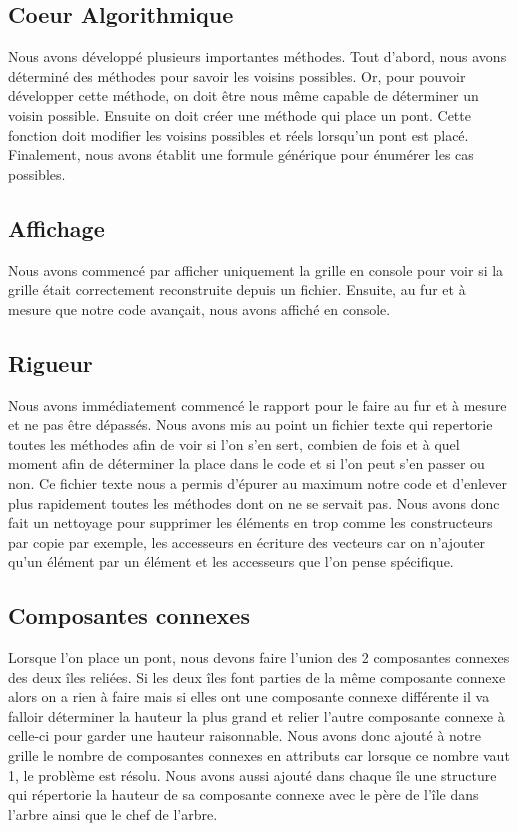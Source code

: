\documentclass{article}
\begin{document}
    \subsection{\Large Coeur Algorithmique}
    \hspace{0.5cm} Nous avons développé plusieurs importantes méthodes. Tout d'abord, nous avons déterminé des méthodes pour savoir les voisins possibles. Or, pour pouvoir développer cette méthode, on doit être nous même capable de déterminer un voisin possible. Ensuite on doit créer une méthode qui place un pont. Cette fonction doit modifier les voisins possibles et réels lorsqu'un pont est placé.
    Finalement, nous avons établit une formule générique pour énumérer les cas possibles.
    
    \subsection{\Large Affichage}
    \hspace{0.5cm} Nous avons commencé par afficher uniquement la grille en console pour voir si la grille était correctement reconstruite depuis un fichier. Ensuite, au fur et à mesure que notre code avançait, nous avons affiché en console.
    
    \subsection{\Large Rigueur}
    \hspace{0.5cm} Nous avons immédiatement commencé le rapport pour le faire au fur et à mesure et ne pas être dépassés. 
    Nous avons mis au point un fichier texte qui repertorie toutes les méthodes afin de voir si l'on s'en sert, combien de fois et à quel moment afin de déterminer la place dans le code et si l'on peut s'en passer ou non. Ce fichier texte nous a permis d'épurer au maximum notre code et d'enlever plus rapidement toutes les méthodes dont on ne se servait pas. Nous avons donc fait un nettoyage pour supprimer les éléments en trop comme les constructeurs par copie par exemple, les accesseurs en écriture des vecteurs car on n'ajouter qu'un élément par un élément et les accesseurs que l'on pense spécifique.
    
    \subsection{\Large Composantes connexes}
    \hspace{0.5cm} Lorsque l'on place un pont, nous devons faire l'union des 2 composantes connexes des deux îles reliées. Si les deux îles font parties de la même composante connexe alors on a rien à faire mais si elles ont une composante connexe différente il va falloir déterminer la hauteur la plus grand et relier l'autre composante connexe à celle-ci pour garder une hauteur raisonnable. 
    Nous avons donc ajouté à notre grille le nombre de composantes connexes en attributs car lorsque ce nombre vaut 1, le problème est résolu. Nous avons aussi ajouté dans chaque île une structure qui répertorie la hauteur de sa composante connexe avec le père de l'île dans l'arbre ainsi que le chef de l'arbre.
\end{document}
